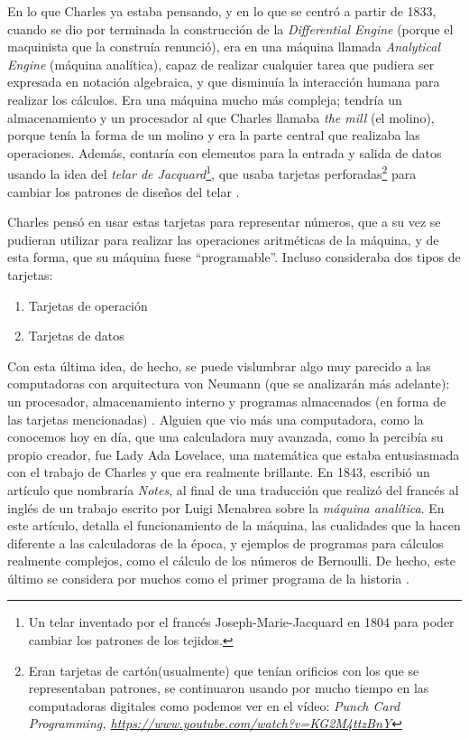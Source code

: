\documentclass[letterpaper,12pt,oneside]{book}
\begin{document}
		En lo que Charles ya estaba pensando, y en lo que se centró a partir de 1833, cuando se dio por terminada la construcción de la \textit{Differential Engine} (porque el maquinista que la 
		construía renunció), era en una máquina llamada  \textit{Analytical Engine} (máquina analítica), capaz de realizar cualquier tarea que pudiera
		ser expresada en notación algebraica,  y que disminuía la interacción humana para realizar los cálculos.   Era una máquina mucho más compleja; tendría un
		almacenamiento y un procesador al que Charles llamaba \textit{the mill} (el molino), porque tenía la forma de un molino y era la parte central que realizaba las operaciones. Además,
		contaría con elementos para la entrada y salida de datos usando la idea del \textit{telar de Jacquard}\footnote{Un telar inventado por el francés Joseph-Marie-Jacquard en 1804 para poder cambiar los patrones de los tejidos.}, que usaba tarjetas perforadas\footnote{Eran tarjetas de 
		cartón(usualmente) que tenían orificios con los que se representaban patrones, se continuaron usando por mucho tiempo en las computadoras digitales como podemos ver en 
		el vídeo: \emph{Punch Card Programming, \url{https://www.youtube.com/watch?v=KG2M4ttzBnY} }}
		para cambiar los patrones de diseños del telar \cite{oregan_brief_2012}.
  
        Charles pensó en usar estas tarjetas para representar números, que a su vez se pudieran utilizar para realizar las operaciones
		aritméticas de la máquina, y de esta forma,  que su máquina fuese ``programable''. Incluso consideraba dos tipos de tarjetas:
		
		\begin{enumerate}
			\item Tarjetas de operación
			\item Tarjetas de datos
		\end{enumerate}
		
		Con esta última idea, de hecho, se puede vislumbrar algo muy parecido a las computadoras con arquitectura von Neumann (que se analizarán más adelante): un procesador, almacenamiento interno y 
		programas almacenados (en forma de las tarjetas mencionadas) \cite[p.204]{oregan_brief_2012}. 
        Alguien que vio más una computadora, como la conocemos hoy en día, que una calculadora muy avanzada, como la percibía
        su propio creador, fue  Lady Ada Lovelace, una matemática
		que estaba entusiasmada con el trabajo de Charles y que era realmente brillante. En 1843, escribió un artículo que 
		nombraría \textit{Notes}, al final de una traducción  que realizó del francés al inglés de un trabajo
		 escrito por Luigi Menabrea sobre la \textit{máquina analítica}. En este artículo, detalla el funcionamiento de la máquina, las cualidades que la 
		hacen diferente a las calculadoras de la época, y
		ejemplos de programas para cálculos realmente complejos, como el cálculo de los números de Bernoulli. De hecho, este último se considera por muchos como
		el primer programa de la historia \cite{eric_kim_ada_1999}.
  
\end{document}
